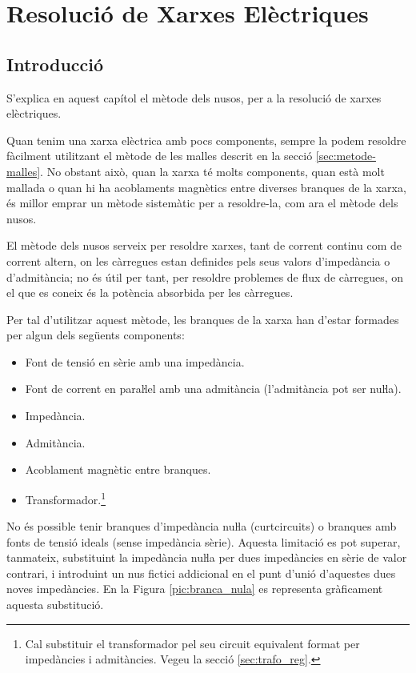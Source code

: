 \chapter{Resolució de Xarxes Elèctriques} \label{chap:nusos}
\section{Introducció}
S'explica en aquest capítol el
mètode dels nusos, per a la resolució de xarxes elèctriques.

Quan tenim una xarxa elèctrica amb pocs components, sempre la podem resoldre fàcilment
utilitzant el mètode de les malles descrit en la secció \vref{sec:metode-malles}. No obstant això, quan la xarxa té molts components, quan està
 molt mallada o quan hi ha acoblaments magnètics entre diverses branques de la xarxa, és millor
 emprar un mètode sistemàtic per a resoldre-la, com ara el mètode dels nusos.

El mètode dels nusos serveix per resoldre xarxes, tant de corrent
continu com de corrent altern, on les càrregues estan definides pels
seus valors d'impedància o d'admitància; no és útil per tant, per
resoldre problemes de flux de càrregues, on el que es coneix és la
potència absorbida per les càrregues.

Per tal d'utilitzar aquest mètode, les branques de la xarxa han d'estar
formades per algun dels següents components: \vspace{-1.5mm}
\begin{itemize}
   \item Font de tensió en sèrie amb una impedància.
   \item Font de corrent en paraŀlel amb una admitància (l'admitància pot ser nuŀla).
   \item Impedància.
   \item Admitància.
   \item Acoblament magnètic entre branques.
   \item Transformador.\footnote{Cal substituir el transformador pel seu circuit equivalent format per impedàncies i    admitàncies. Vegeu la secció \ref{sec:trafo_reg}.}
\end{itemize}
\vspace{-1.5mm}

No és possible tenir branques d'impedància nuŀla (curtcircuits) o
branques amb fonts de tensió ideals (sense impedància sèrie).
Aquesta limitació es pot superar, tanmateix, substituint la
impedància nuŀla per dues impedàncies en sèrie  de valor
contrari, i introduint un nus fictici addicional en el punt d'unió
d'aquestes dues noves impedàncies. En la Figura
\vref{pic:branca_nula}
 es representa gràficament aquesta substitució. 
\begin{center}
   
    \label{pic:branca_nula}
\end{center}

